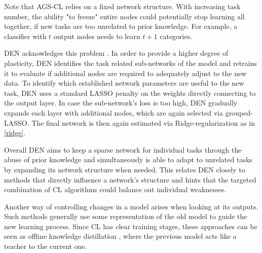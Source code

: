 Note that AGS-CL relies on a fixed network structure. With increasing task number, the ability "to freeze" entire nodes could potentially stop learning all together, if new tasks are too unrelated to prior knowledge. For example, a classifier with $t$ output nodes needs to learn $t+1$ categories. 

DEN acknowledges this problem \cite{yoon2018lifelonglearningdynamicallyexpandable}. In order to provide a higher degree of plasticity, DEN identifies the task related sub-networks of the model and retrains it to evaluate if additional nodes are required to adequately adjust to the new data. To identify which established network parameters are useful to the new task, DEN uses a standard LASSO penalty on the weights directly connecting to the output layer. In case the sub-network's loss is too high, DEN gradually expands each layer with additional nodes, which are again selected via grouped-LASSO. The final network is then again estimated via Ridge-regularization as in \eqref{ridge}. 

Overall DEN aims to keep a sparse network for individual tasks through the abuse of prior knowledge and simultaneously is able to adapt to unrelated tasks by expanding its network structure when needed. This relates DEN closely to methods that directly influence a network's structure and hints that the targeted combination of CL algorithms could balance out individual weaknesses. 

Another way of controlling changes in a model arises when looking at its outputs. Such methods generally use some representation of the old model to guide the new learning process. Since CL has clear training stages, these approaches can be seen as offline knowledge distillation \cite{Gou_2021}, where the previous model acts like a teacher to the current one.
